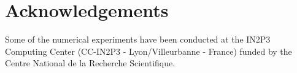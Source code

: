 \documentclass[twocolumn,twocolappendix,nofootinbib,iop]{openjournal}
\newcommand{\FrL}[1]{{\color{cyan}FL: #1}}
\begin{document}
\section*{Acknowledgements}
Some of the numerical experiments have been conducted at the IN2P3 Computing Center (CC-IN2P3 - Lyon/Villeurbanne - France) funded by the Centre National de la Recherche Scientifique.





% 
 
\typeout{}


\end{document}

